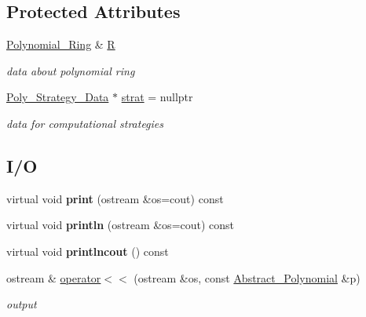 \subsection*{Protected Attributes}
\begin{DoxyCompactItemize}
\item 
\mbox{\label{class_abstract___polynomial_a551ade20b7dcd96c227dd0401f6ffbbe}} 
\hyperlink{class_polynomial___ring}{Polynomial\+\_\+\+Ring} \& \hyperlink{class_abstract___polynomial_a551ade20b7dcd96c227dd0401f6ffbbe}{R}
\begin{DoxyCompactList}\small\item\em data about polynomial ring \end{DoxyCompactList}\item 
\mbox{\label{class_abstract___polynomial_a764336acff942ed6d6e160b5d62f90c1}} 
\hyperlink{class_poly___strategy___data}{Poly\+\_\+\+Strategy\+\_\+\+Data} $\ast$ \hyperlink{class_abstract___polynomial_a764336acff942ed6d6e160b5d62f90c1}{strat} = nullptr
\begin{DoxyCompactList}\small\item\em data for computational strategies \end{DoxyCompactList}\end{DoxyCompactItemize}
\subsection*{I/O}
\begin{DoxyCompactItemize}
\item 
\mbox{\label{class_abstract___polynomial_adbbb6af1fb79d5794af42e28d584641b}} 
virtual void {\bfseries print} (ostream \&os=cout) const
\item 
\mbox{\label{class_abstract___polynomial_a597dc990980f1936e86dbf8940dbeecd}} 
virtual void {\bfseries println} (ostream \&os=cout) const
\item 
\mbox{\label{class_abstract___polynomial_a69dfd6bd725e126d2476826fb345c5f6}} 
virtual void {\bfseries printlncout} () const
\item 
\mbox{\label{class_abstract___polynomial_aadc14212f0cbdb81df9977916cc13798}} 
ostream \& \hyperlink{class_abstract___polynomial_aadc14212f0cbdb81df9977916cc13798}{operator$<$$<$} (ostream \&os, const \hyperlink{class_abstract___polynomial}{Abstract\+\_\+\+Polynomial} \&p)
\begin{DoxyCompactList}\small\item\em output \end{DoxyCompactList}\end{DoxyCompactItemize}


